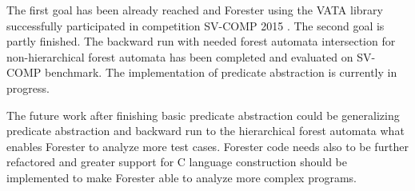 \documentclass[fleqn,11pt]{ExcelAtFIT} %
\begin{document}
The first goal has been already reached and Forester using the VATA library successfully participated in competition SV-COMP 2015 \cite{www:svcomp}.
The second goal is partly finished.
The backward run with needed forest automata intersection for non-hierarchical forest automata has been completed and evaluated on SV-COMP benchmark.
The implementation of predicate abstraction is currently in progress.

The future work after finishing basic predicate abstraction could be generalizing predicate abstraction and backward run to the hierarchical forest automata
what enables Forester to analyze more test cases.
Forester code needs also to be further refactored and greater support for C language construction should be implemented to make Forester able
to analyze more complex programs.






\end{document}
